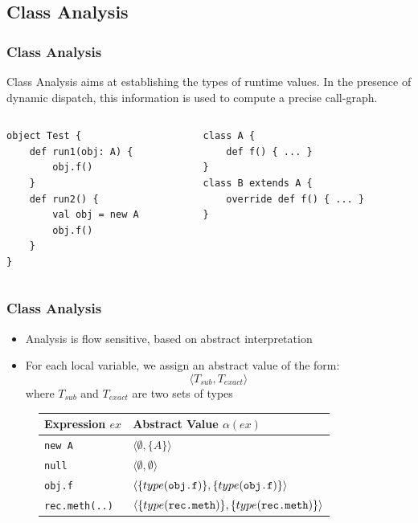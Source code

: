 \documentclass[hyperref={pdfpagelabels=false}]{beamer}
\begin{document}
\subsection{Class Analysis}
\begin{frame}[fragile]
\frametitle{Class Analysis}

    Class Analysis aims at establishing the types of runtime values. In
    the presence of dynamic dispatch, this information is used to compute a
    precise call-graph.

    \begin{columns}
      \begin{column}{0.5\textwidth}
\begin{lstlisting}
object Test {
    def run1(obj: A) {
        obj.f()
    }
    def run2() {
        val obj = new A
        obj.f()
    }
}
\end{lstlisting}
      \end{column}
      \begin{column}{0.5\textwidth}
\begin{lstlisting}
class A {
    def f() { ... }
}
class B extends A {
    override def f() { ... }
}
\end{lstlisting}
      \end{column}
    \end{columns}


\end{frame}

\begin{frame}[fragile]
    \frametitle{Class Analysis}
    \begin{itemize}
        \item Analysis is flow sensitive, based on abstract interpretation
        \item For each local variable, we assign an abstract value of the form:
        $$ \langle T_{sub}, T_{exact} \rangle $$ where $T_{sub}$ and
        $T_{exact}$ are two sets of types
    \end{itemize}

\begin{figure}
    \begin{tabular}{ l | l }
        Expression $ex$       & Abstract Value $\alpha(ex)$\\
        \hline
        \verb/new A/          & $\langle \emptyset, \{ A \} \rangle$ \\
        \verb/null/           & $\langle \emptyset, \emptyset \rangle$ \\
        \verb/obj.f/          & $\langle\{type(\verb/obj.f/)\}, \{type(\verb/obj.f/)\} \rangle$ \\
        \verb/rec.meth(..)/   & $\langle\{type(\verb/rec.meth/)\}, \{type(\verb/rec.meth/)\} \rangle$ \\
    \end{tabular}
\end{figure}
\end{frame}
\end{document}
